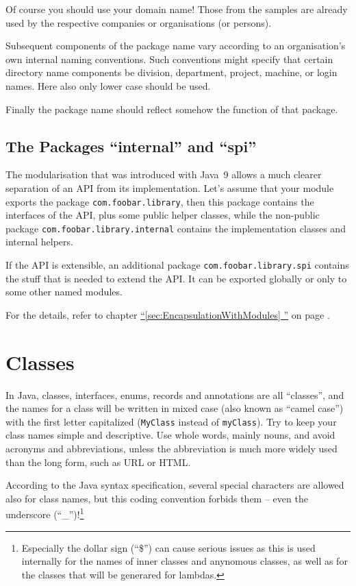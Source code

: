 \documentclass[12pt,a4paper,titlepage, parskip=half, headsepline, footsepline, cleardoubleplain]{scrbook}
\newcommand*{\tqfullvref}[1]{\hyperref[{#1}]{“\ref*{#1} \nameref*{#1}”} on page \pageref{#1}}
\begin{document}
Of course you should use your domain name! Those from the samples are already used by the respective companies or organisations (or persons).

Subsequent components of the package name vary according to an organisation's own internal naming conventions. Such conventions might specify that certain directory name components be division, department, project, machine, or login names. Here also only lower case should be used.

Finally the package name should reflect somehow the function of that package.

\subsection{The Packages “internal” and “spi”}
The modularisation that was introduced with Java~9 allows a much clearer separation of an API from its implementation. Let's assume that your module exports the package \lstinline|com.foobar.library|, then this package contains the interfaces of the API, plus some public helper classes, while the non-public package \lstinline|com.foobar.library.internal| contains the implementation classes and internal helpers.

If the API is extensible, an additional package \lstinline|com.foobar.library.spi| contains the stuff that is needed to extend the API. It can be exported globally or only to some other named modules.

For the details, refer to chapter \tqfullvref{sec:EncapsulationWithModules}.

\section{Classes}\label{sec:Classes}
In Java, classes, interfaces, enums, records and annotations are all “classes”, and the names for a class will be written in mixed case (also known as “camel case”) with the first letter capitalized (\lstinline|MyClass| instead of \lstinline|myClass|). Try to keep your class names simple and descriptive. Use whole words, mainly nouns, and avoid acronyms and abbreviations, unless the abbreviation is much more widely used than the long form, such as URL or HTML.

According to the Java syntax specification, several special characters are allowed also for class names, but this coding convention forbids them – even the underscore (“\_”)!\footnote{Especially the dollar sign (“\$”) can cause serious issues as this is used internally for the names of inner classes and anynomous classes, as well as for the classes that will be generared for lambdas.}
\end{document}
